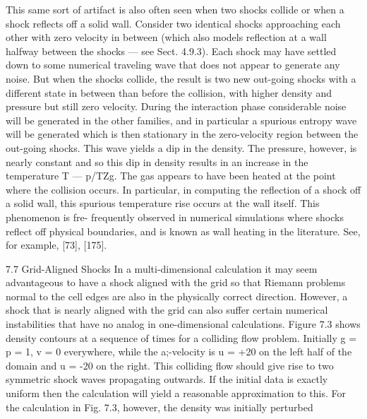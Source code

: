This same sort of artifact is also often seen when two shocks collide or when a
shock reflects off a solid wall. Consider two identical shocks approaching each
other with zero velocity in between (which also models reflection at a wall
halfway between the shocks — see Sect. 4.9.3). Each shock may have settled
down to some numerical traveling wave that does not appear to generate any
noise. But when the shocks collide, the result is two new out-going shocks
with a different state in between than before the collision, with higher density
and pressure but still zero velocity. During the interaction phase considerable
noise will be generated in the other families, and in particular a spurious
entropy wave will be generated which is then stationary in the zero-velocity
region between the out-going shocks. This wave yields a dip in the density.
The pressure, however, is nearly constant and so this dip in density results
in an increase in the temperature T — p/TZg. The gas appears to have been
heated at the point where the collision occurs.
In particular, in computing the reflection of a shock off a solid wall, this
spurious temperature rise occurs at the wall itself. This phenomenon is fre-
frequently observed in numerical simulations where shocks reflect off physical
boundaries, and is known as wall heating in the literature. See, for example,
[73], [175].


7.7 Grid-Aligned Shocks
In a multi-dimensional calculation it may seem advantageous to have a shock
aligned with the grid so that Riemann problems normal to the cell edges
are also in the physically correct direction. However, a shock that is nearly
aligned with the grid can also suffer certain numerical instabilities that have
no analog in one-dimensional calculations. Figure 7.3 shows density contours
at a sequence of times for a colliding flow problem. Initially g = p = 1,
v = 0 everywhere, while the a;-velocity is u = +20 on the left half of the
domain and u = -20 on the right. This colliding flow should give rise to two
symmetric shock waves propagating outwards. If the initial data is exactly
uniform then the calculation will yield a reasonable approximation to this.
For the calculation in Fig. 7.3, however, the density was initially perturbed

